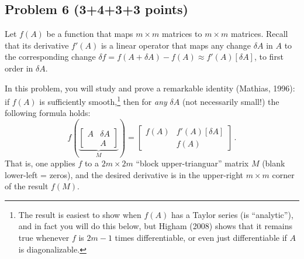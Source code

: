 \documentclass[10pt,oneside]{article}
\begin{document}
 
\subsection*{Problem 6 (3+4+3+3 points)}

Let $f(A)$ be a function that maps $m \times m$ matrices to $m \times m$ matrices.  Recall that its derivative $f'(A)$ is a linear operator that maps any change $\delta A$ in $A$ to the corresponding change $\delta f = f(A+\delta A) - f(A) \approx f'(A)[\delta A]$, to first order in $\delta A$.

In this problem, you will study and prove a remarkable identity (Mathias, 1996): if $f(A)$ is sufficiently smooth,\footnote{The result is easiest to show when $f(A)$ has a Taylor series (is ``analytic''), and in fact you will do this below, but Higham (2008) shows that it remains true whenever $f$ is $2m-1$ times differentiable, or even just differentiable if $A$ is diagonalizable.} then for \emph{any} 
$\delta A$ (not necessarily small!) the following formula holds:
$$
f\left(\underbrace{\begin{bmatrix} A & \delta A \\ & A \end{bmatrix}}_M\right) = \begin{bmatrix} f(A) & f'(A)[\delta A] \\ & f(A) \end{bmatrix} \, .
$$
That is, one applies $f$ to a $2m \times 2m$ ``block upper-trianguar'' matrix $M$ (blank lower-left = zeros), and the desired derivative is in the upper-right $m \times m$ corner of the result $f(M)$.
\end{document}

